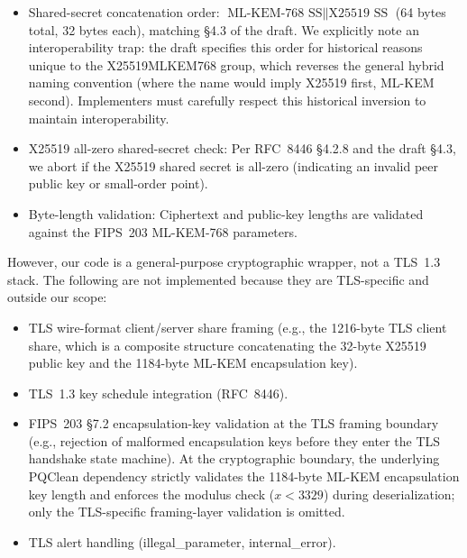 \documentclass[11pt,a4paper]{article}
\def\textbf#1{#1}%
\def\texttt#1{#1}%
\def\emph#1{#1}%
\begin{document}
\begin{itemize}
    \item \textbf{Shared-secret concatenation order:} $\text{ML-KEM-768 SS} \parallel \text{X25519 SS}$ (64 bytes total, 32 bytes each), matching \S4.3 of the draft. \textbf{We explicitly note an interoperability trap}: the draft specifies this order for historical reasons unique to the X25519MLKEM768 group, which reverses the general hybrid naming convention (where the name would imply X25519 first, ML-KEM second). Implementers must carefully respect this historical inversion to maintain interoperability.
    \item \textbf{X25519 all-zero shared-secret check:} Per RFC~8446 \S4.2.8 and the draft \S4.3, we abort if the X25519 shared secret is all-zero (indicating an invalid peer public key or small-order point).
    \item \textbf{Byte-length validation:} Ciphertext and public-key lengths are validated against the FIPS~203 ML-KEM-768 parameters.
\end{itemize}

However, our code is a \emph{general-purpose cryptographic wrapper}, not a TLS~1.3 stack. The following \textbf{are not implemented} because they are TLS-specific and outside our scope:
\begin{itemize}
    \item TLS wire-format client/server share framing (e.g., the 1216-byte TLS client share, which is a composite structure concatenating the 32-byte X25519 public key and the 1184-byte ML-KEM encapsulation key).
    \item TLS~1.3 key schedule integration (RFC~8446).
    \item FIPS~203 \S7.2 encapsulation-key validation at the \emph{TLS framing boundary} (e.g., rejection of malformed encapsulation keys before they enter the TLS handshake state machine). At the \emph{cryptographic boundary}, the underlying PQClean dependency strictly validates the 1184-byte ML-KEM encapsulation key length and enforces the modulus check ($x < 3329$) during deserialization; only the TLS-specific framing-layer validation is omitted.
    \item TLS alert handling (\texttt{illegal\_parameter}, \texttt{internal\_error}).
\end{itemize}
\end{document}
